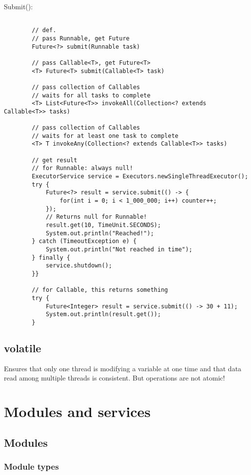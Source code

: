 \documentclass{scrartcl}
\begin{document}
    Submit():
    \begin{lstlisting}

        // def.
        // pass Runnable, get Future
        Future<?> submit(Runnable task)

        // pass Callable<T>, get Future<T>
        <T> Future<T> submit(Callable<T> task)

        // pass collection of Callables
        // waits for all tasks to complete
        <T> List<Future<T>> invokeAll(Collection<? extends Callable<T>> tasks)

        // pass collection of Callables
        // waits for at least one task to complete
        <T> T invokeAny(Collection<? extends Callable<T>> tasks)

        // get result
        // for Runnable: always null!
        ExecutorService service = Executors.newSingleThreadExecutor();
        try {
            Future<?> result = service.submit(() -> {
                for(int i = 0; i < 1_000_000; i++) counter++;
            });
            // Returns null for Runnable!
            result.get(10, TimeUnit.SECONDS);
            System.out.println("Reached!");
        } catch (TimeoutException e) {
            System.out.println("Not reached in time");
        } finally {
            service.shutdown();
        }}

        // for Callable, this returns something
        try {
            Future<Integer> result = service.submit(() -> 30 + 11);
            System.out.println(result.get());
        }
    \end{lstlisting}

\subsection{volatile}

    Ensures that only one thread is modifying a variable at one time and that data read among multiple threads is consistent.
    But operations are not atomic!

\section{Modules and services}
\subsection{Modules}
\subsubsection{Module types}
\end{document}
